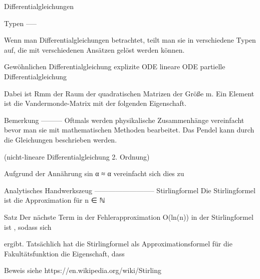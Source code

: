 Differentialgleichungen

Typen
-----

Wenn man Differentialgleichungen betrachtet, teilt man sie in verschiedene Typen auf, die mit verschiedenen Ansätzen gelöst werden können.

Gewöhnlichen Differentialgleichung
explizite ODE
lineare ODE
partielle Differentialgleichung

Dabei ist Rmm der Raum der quadratischen Matrizen der Größe m. Ein Element ist die Vandermonde-Matrix mit der folgenden Eigenschaft.


Bemerkung
---------
Oftmals werden physikalische Zusammenhänge vereinfacht bevor man sie mit mathematischen Methoden bearbeitet. Das Pendel kann durch die Gleichungen beschrieben werden.


(nicht-lineare Differentialgleichung 2. Ordnung)

Aufgrund der Annährung sin α ≈ α vereinfacht sich dies zu

Analytisches Handwerkszeug
--------------------------
Stirlingformel
Die Stirlingformel ist die Approximation für n ∈ ℕ

Satz
Der nächste Term in der Fehlerapproximation O(ln(n)) in der Stirlingformel ist , sodass sich 

ergibt. Tatsächlich hat die Stirlingformel als Approximationsformel für die Fakultätsfunktion die Eigenschaft, dass

Beweis siehe https://en.wikipedia.org/wiki/Stirling%